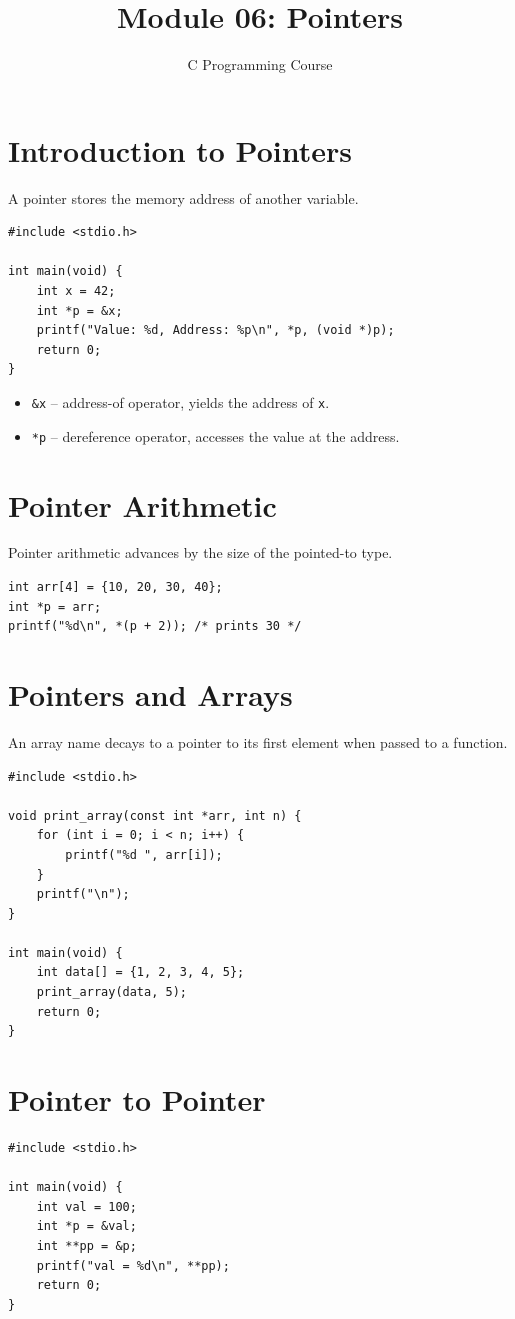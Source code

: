 \documentclass[11pt,a4paper]{article}
\title{Module 06: Pointers}
\author{C Programming Course}
\date{}
\begin{document}
\maketitle
\thispagestyle{fancy}

\section{Introduction to Pointers}
A pointer stores the memory address of another variable.

\begin{lstlisting}
#include <stdio.h>

int main(void) {
    int x = 42;
    int *p = &x;
    printf("Value: %d, Address: %p\n", *p, (void *)p);
    return 0;
}
\end{lstlisting}

\begin{itemize}
  \item \texttt{\&x} -- address-of operator, yields the address of \texttt{x}.
  \item \texttt{*p} -- dereference operator, accesses the value at the address.
\end{itemize}

\section{Pointer Arithmetic}
Pointer arithmetic advances by the size of the pointed-to type.

\begin{lstlisting}
int arr[4] = {10, 20, 30, 40};
int *p = arr;
printf("%d\n", *(p + 2)); /* prints 30 */
\end{lstlisting}

\section{Pointers and Arrays}
An array name decays to a pointer to its first element when passed to a function.

\begin{lstlisting}
#include <stdio.h>

void print_array(const int *arr, int n) {
    for (int i = 0; i < n; i++) {
        printf("%d ", arr[i]);
    }
    printf("\n");
}

int main(void) {
    int data[] = {1, 2, 3, 4, 5};
    print_array(data, 5);
    return 0;
}
\end{lstlisting}

\section{Pointer to Pointer}
\begin{lstlisting}
#include <stdio.h>

int main(void) {
    int val = 100;
    int *p = &val;
    int **pp = &p;
    printf("val = %d\n", **pp);
    return 0;
}
\end{lstlisting}
\end{document}
